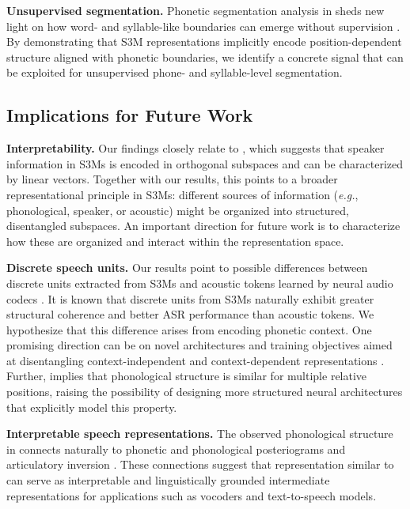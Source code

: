 \documentclass[cameraready]{Interspeech}
\begin{document}
\textbf{Unsupervised segmentation.}
Phonetic segmentation analysis in  sheds new light on how word- and syllable-like boundaries can emerge without supervision \cite{pasad2024self,baade2025syllablelm,cho2025sylber,cho2026sylber,visser2026zerosyl,li2023dissecting}.
By demonstrating that S3M representations implicitly encode position-dependent structure aligned with phonetic boundaries, we identify a concrete signal that can be exploited for unsupervised phone- and syllable-level segmentation.


\subsection{Implications for Future Work}
\textbf{Interpretability.}
Our findings closely relate to \cite{liu2023self,feng2022silence,kamper2025linearvc}, which suggests that speaker information in S3Ms is encoded in orthogonal subspaces and can be characterized by linear vectors.
Together with our results, this points to a broader representational principle in S3Ms: different sources of information (\textit{e.g.}, phonological, speaker, or acoustic) might be organized into structured, disentangled subspaces.
An important direction for future work is to characterize how these are organized and interact within the representation space.


\textbf{Discrete speech units.}
Our results point to possible differences between discrete units extracted from S3Ms \cite{chang2024exploring} and acoustic tokens learned by neural audio codecs \cite{mousavi2025discrete}.
It is known that discrete units from S3Ms naturally exhibit greater structural coherence \cite{borsos2023audiolm} and better ASR performance \cite{chang2024exploring} than acoustic tokens.
We hypothesize that this difference arises from encoding phonetic context.
One promising direction can be on novel architectures and training objectives aimed at disentangling context-independent and context-dependent representations \cite{defossez2024moshi,zhang2024speechtokenizer,huang2026kanade}.
Further,  implies that phonological structure is similar for multiple relative positions, raising the possibility of designing more structured neural architectures that explicitly model this property.


\textbf{Interpretable speech representations.}
The observed phonological structure in  connects naturally to phonetic and phonological posteriograms \cite{hazen2009query,morrison2024fine,cernak2015phonological} and articulatory inversion \cite{cho2024coding}.
These connections suggest that representation similar to  can serve as interpretable and linguistically grounded intermediate representations for applications such as vocoders and text-to-speech models.
\end{document}

